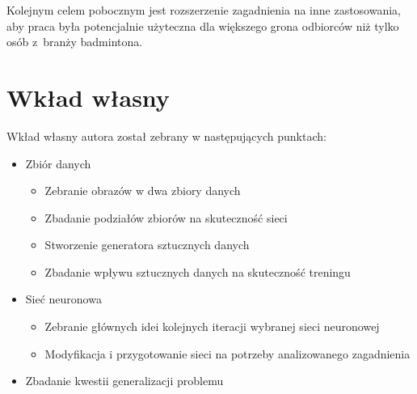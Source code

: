 Kolejnym celem pobocznym jest rozszerzenie zagadnienia na inne zastosowania, aby praca była potencjalnie użyteczna dla większego grona odbiorców niż tylko osób z~branży badmintona.
\\

\section{Wkład własny}

Wkład własny autora został zebrany w następujących punktach:

\begin{itemize}
	\item Zbiór danych
    \begin{itemize}
      \item Zebranie obrazów w dwa zbiory danych 
      \item Zbadanie podziałów zbiorów na skuteczność sieci 
			\item Stworzenie generatora sztucznych danych 
			\item Zbadanie wpływu sztucznych danych na skuteczność treningu 
		\end{itemize}
	\item Sieć neuronowa
	\begin{itemize}
		\item Zebranie głównych idei kolejnych iteracji wybranej sieci neuronowej 
		\item Modyfikacja i przygotowanie sieci na potrzeby analizowanego zagadnienia 
	\end{itemize}
	\item Zbadanie kwestii generalizacji problemu 
\end{itemize}
